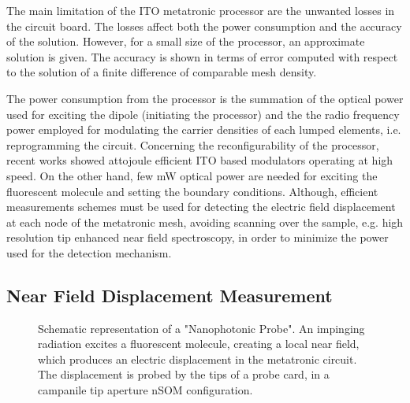 \par The main limitation of the ITO metatronic processor are the unwanted losses in the circuit board. The losses affect both the power consumption and the accuracy of the solution. However, for a small size of the processor, an approximate solution is given. The accuracy is shown in terms of error computed with respect to the solution of a finite difference of comparable mesh density.

\par The power consumption from the processor is the summation of the optical power used for exciting the dipole (initiating the processor) and the the radio frequency power employed for modulating the carrier densities of each lumped elements, i.e. reprogramming the circuit. Concerning the reconfigurability of the processor, recent works showed attojoule efficient \cite{amin_attojoule_2018,dalir_atto-joule_2018} ITO based modulators operating at high speed. On the other hand, few mW optical power are needed for exciting the fluorescent molecule and setting the boundary conditions. Although, efficient measurements schemes must be used for detecting the electric field displacement at each node of the metatronic mesh, avoiding scanning over the sample, e.g. high resolution tip enhanced near field spectroscopy, in order to minimize the power used for the detection mechanism.

\subsection{\label{sec:Probe} Near Field Displacement Measurement}

\begin{figure}[h]
\centering{}
\caption{Schematic representation of a "Nanophotonic Probe". An impinging radiation excites a fluorescent molecule, creating a local near field, which produces an electric displacement in the metatronic circuit. The displacement is probed by the tips of a probe card, in a campanile tip aperture nSOM configuration.}
\label{fig:nanophotonic_probe}
\end{figure}

